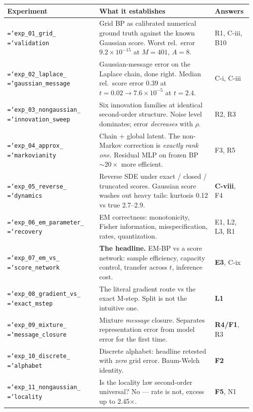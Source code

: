 \documentclass[11pt,a4paper]{article}
\newcommand{\code}[1]{\texttt{\small\hyphenchar\font=`\-\relax #1}}
\begin{document}
\begin{center}
\small
\begin{longtable}{@{}p{2.9cm}p{9.0cm}p{2.9cm}@{}}
\toprule
\textbf{Experiment} & \textbf{What it establishes} & \textbf{Answers} \\
\midrule
\endhead
\code{exp\_01\_grid\_} \code{validation} & Grid BP as calibrated numerical ground truth against the known Gaussian score. Worst rel.\ error $9.2\times10^{-15}$ at $M=401$, $A=8$. & R1, C-iii, B10 \\
\code{exp\_02\_laplace\_} \code{gaussian\_message} & Gaussian-message error on the Laplace chain, done right. Median rel.\ score error $0.39$ at $t=0.02 \to 7.6\times10^{-5}$ at $t=2.4$. & C-i, C-iii \\
\code{exp\_03\_nongaussian\_} \code{innovation\_sweep} & Six innovation families at identical second-order structure. Noise level dominates; error \emph{decreases} with $\rho$. & R2, R3 \\
\code{exp\_04\_approx\_} \code{markovianity} & Chain $+$ global latent. The non-Markov correction is \emph{exactly rank one}. Residual MLP on frozen BP ${\sim}20\times$ more efficient. & F3, R5 \\
\code{exp\_05\_reverse\_} \code{dynamics} & Reverse SDE under exact / closed / truncated scores. Gaussian score washes out heavy tails: kurtosis 0.12 vs true 2.7--2.9. & \textbf{C-viii}, F4 \\
\code{exp\_06\_em\_parameter\_} \code{recovery} & EM correctness: monotonicity, Fisher information, misspecification, rates, quantization. & E1, L2, L3, R1 \\
\code{exp\_07\_em\_vs\_} \code{score\_network} & \textbf{The headline.} EM-BP vs a score network: sample efficiency, capacity control, transfer across $t$, inference cost. & \textbf{E3}, C-ix \\
\code{exp\_08\_gradient\_vs\_} \code{exact\_mstep} & The literal gradient route vs the exact M-step. Split is not the intuitive one. & \textbf{L1} \\
\code{exp\_09\_mixture\_} \code{message\_closure} & Mixture \emph{message} closure. Separates representation error from model error for the first time. & \textbf{R4/F1}, R3 \\
\code{exp\_10\_discrete\_} \code{alphabet} & Discrete alphabet: headline retested with \emph{zero} grid error. Baum-Welch identity. & \textbf{F2} \\
\code{exp\_11\_nongaussian\_} \code{locality} & Is the locality law second-order universal? No --- rate is not, excess up to 2.45$\times$. & \textbf{F5}, N1 \\

\end{longtable}
\end{center}
\end{document}
